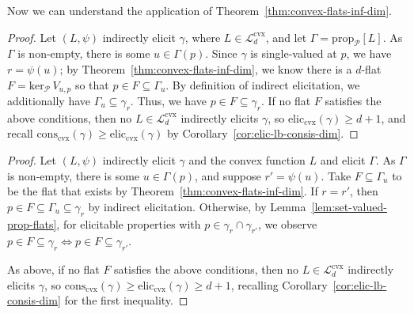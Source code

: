 \documentclass[11pt]{article} %
\newcommand{\Comments}{1}
\newcommand{\mynote}[2]{\ifnum\Comments=1\textcolor{#1}{#2}\fi}
\newcommand{\jessie}[1]{\mynote{purple}{[JF: #1]}}
\newcommand{\relint}[1]{\mathrm{relint}(#1)}
\newcommand{\prop}[2][\mathcal{P}]{\mathrm{prop}_{#1}[#2]}
\newcommand{\eliccvx}{\mathrm{elic}_\mathrm{cvx}}
\newcommand{\conscvx}{\mathrm{cons}_\mathrm{cvx}}
\newcommand{\range}{\mathrm{range}\,}
\newcommand{\zeros}[1]{\mathrm{ker}_\P\,#1}
\newcommand{\Pcodimension}{$\mathcal{P}$-codimension\,}
\newcommand{\Lcvx}{\mathcal{L}^{\mathrm{cvx}}}
\renewcommand{\P}{\mathcal{P}}
\newcommand{\Y}{\mathcal{Y}}
\newtheorem{lemma}{Lemma}
\begin{document}
Now we can understand the application of Theorem~\ref{thm:convex-flats-inf-dim}.

\Pcodimflatsinglevalprop*

\begin{proof}
	Let $(L, \psi)$ indirectly elicit $\gamma$, where $L\in\Lcvx_d$, and let $\Gamma = \prop{L}$.
	As $\Gamma$ is non-empty, there is some $u \in \Gamma(p)$.
	Since $\gamma$ is single-valued at $p$, we have $r = \psi(u)$; by Theorem~\ref{thm:convex-flats-inf-dim}, we know there is a $d$-flat $F = \zeros{V_{u,p}}$ so that $p \in F \subseteq \Gamma_u$.
	By definition of indirect elicitation, we additionally have $\Gamma_u \subseteq \gamma_r$.
	Thus, we have $p \in F \subseteq \gamma_r$.
	If no flat $F$ satisfies the above conditions, then no $L\in\Lcvx_d$ indirectly elicits $\gamma$, so $\eliccvx(\gamma) \geq d+1$, and recall $\conscvx(\gamma) \geq \eliccvx(\gamma)$ by Corollary~\ref{cor:elic-lb-consis-dim}.
\end{proof}





\Pcodimflatelicrelintprop*
\begin{proof}
	Let $(L, \psi)$ indirectly elicit $\gamma$ and the convex function $L$ and elicit $\Gamma$.
	As $\Gamma$ is non-empty, there is some $u \in \Gamma(p)$, and suppose $r' = \psi(u)$.
	Take $F \subseteq \Gamma_u$ to be the flat that exists by Theorem~\ref{thm:convex-flats-inf-dim}.
	If $r = r'$, then $p \in F \subseteq \Gamma_u \subseteq \gamma_r$ by indirect elicitation.
	Otherwise, by Lemma~\ref{lem:set-valued-prop-flats}, for elicitable properties with $p \in \gamma_r \cap \gamma_{r'}$, we observe $p \in F\subseteq \gamma_r \iff p \in F \subseteq \gamma_{r'}$.
	
	As above, if no flat $F$ satisfies the above conditions, then no $L\in\Lcvx_d$ indirectly elicits $\gamma$, so $\conscvx(\gamma) \geq \eliccvx(\gamma) \geq d+1$, recalling Corollary~\ref{cor:elic-lb-consis-dim} for the first inequality.
\end{proof}
\end{document}

